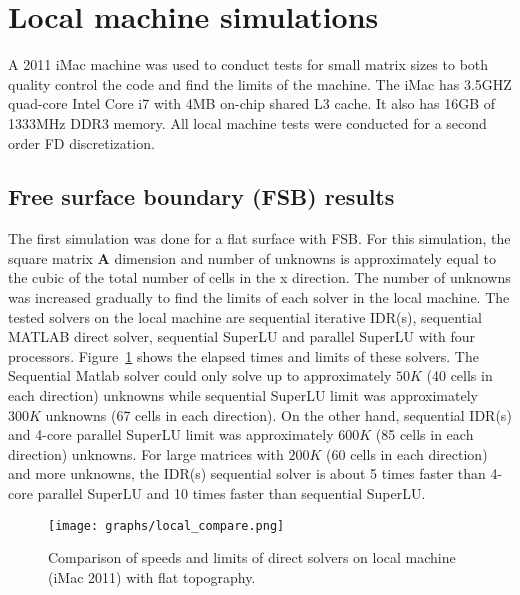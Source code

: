\documentclass[12pt]{article}
\begin{document}
\section{Local machine simulations}
A 2011 iMac machine was used to conduct tests for small matrix sizes to both quality control the code and find the limits of the machine. The iMac has 3.5GHZ quad-core Intel Core i7 with 4MB on-chip shared L3 cache. It also has 16GB of 1333MHz DDR3 memory. All local machine tests were conducted for a second order FD discretization. 
\subsection{Free surface boundary (FSB) results}
The first simulation was done for a flat surface with FSB. For this simulation, the square matrix $\mathbf{A}$ dimension and number of unknowns is approximately equal to the cubic of the total number of cells in the x direction. The number of unknowns was increased gradually to find the limits of each solver in the local machine. The tested solvers on the local machine are sequential iterative IDR(s), sequential MATLAB direct solver, sequential SuperLU and parallel SuperLU with four processors. Figure~\ref{fig:local_compare} shows the elapsed times and limits of these solvers. The Sequential Matlab solver could only solve up to approximately $50K$ (40 cells in each direction) unknowns while sequential SuperLU limit was approximately $300K$ unknowns (67 cells in each direction). On the other hand, sequential IDR(s) and 4-core parallel SuperLU limit was approximately $600K$ (85 cells in each direction) unknowns. For large matrices with $200K$ (60 cells in each direction) and more unknowns, the IDR(s) sequential solver is about 5 times faster than 4-core parallel SuperLU and 10 times faster than sequential SuperLU.

\begin{figure}
	\centering
 \texttt{[image: graphs/local\_compare.png]}
  \caption{Comparison of speeds and limits of direct solvers on local machine (iMac 2011) with flat topography.}
  \label{fig:local_compare}
\end{figure}
\end{document}
